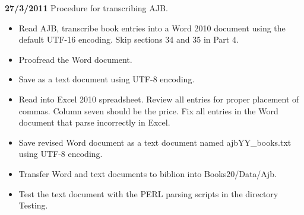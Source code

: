 {\bf 27/3/2011}
Procedure for transcribing AJB.
\begin {itemize}
\item Read AJB, transcribe book entries into a Word 2010 document using
the default UTF-16 encoding. Skip sections 34 and 35 in Part 4.
\item Proofread the Word document.
\item Save as a text document using UTF-8 encoding.
\item Read into Excel 2010 spreadsheet. Review all entries for proper placement
of commas.  Column seven should be the price. Fix all entries in the
Word document that parse incorrectly in Excel.
\item Save revised Word document as a text document named ajbYY\_books.txt using UTF-8 encoding.
\item Transfer Word and text documents to biblion into Books20/Data/Ajb.
\item Test the text document with the PERL parsing scripts in the directory Testing.
\end{itemize}

